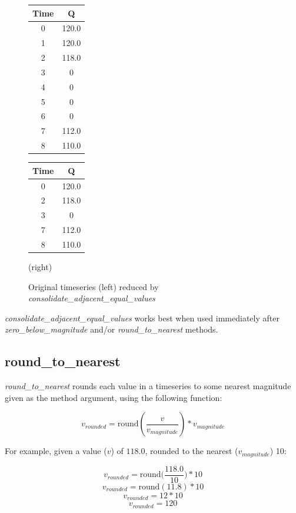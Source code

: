 \documentclass[10pt,twoside,openright]{memoir}
\begin{document}
\begin{figure}[!h]
\begin{tabular}{c c}
    \hline
    Time & Q \\ \hline
    0 & 120.0 \\
    1 & 120.0 \\
    2 & 118.0 \\
    3 & 0 \\
    4 & 0 \\
    5 & 0 \\
    6 & 0 \\
    7 & 112.0 \\
    8 & 110.0
\end{tabular}
\hspace{5cm} 
\begin{tabular}{c c}
    \hline
    Time & Q \\ \hline
    0 & 120.0 \\
    2 & 118.0 \\
    3 & 0 \\
    7 & 112.0 \\
    8 & 110.0
\end{tabular}
\caption{Original timeseries (left) reduced by 
\emph{consolidate\_adjacent\_equal\_values}} (right)
\end{figure}

\emph{consolidate\_adjacent\_equal\_values} works best when used immediately
after \emph{zero\_below\_magnitude} and/or \emph{round\_to\_nearest} methods.

\subsection{round\_to\_nearest}
\emph{round\_to\_nearest} rounds each value in a timeseries to some nearest
magnitude given as the method argument, using the following function:

$$v_{rounded} = \textrm{round}(\frac{v}{v_{magnitude}})*v_{magnitude}$$

For example, given a value ($v$) of $118.0$, rounded to the nearest 
($v_{magnitude}$) 10:

$$v_{rounded} = \textrm{round}\Big(\frac{118.0}{10}\Big)*10$$
$$v_{rounded} = \textrm{round}(11.8)*10$$
$$v_{rounded} = 12*10$$
$$v_{rounded} = 120$$
\end{document}
